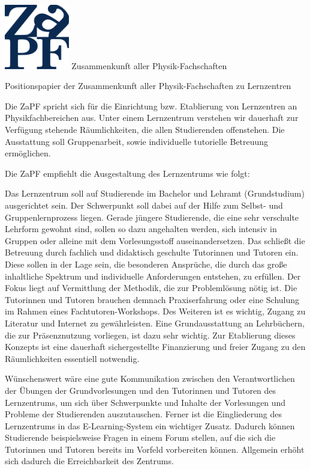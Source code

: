 \documentclass[DIV=calc]{scrartcl}
\begin{document}
\hfill
\begin{minipage}{120pt}
\vspace{-1.8cm}
\includegraphics[width=80pt]{logo.pdf}
\centering
\small Zusammenkunft aller Physik-Fachschaften
\end{minipage}
\begin{center}
\huge{Positionspapier der Zusammenkunft aller Physik-Fachschaften zu Lernzentren} \\
\normalsize
\end{center}

Die ZaPF spricht sich für die Einrichtung bzw. Etablierung von Lernzentren an Physikfachbereichen aus.
Unter einem Lernzentrum verstehen wir dauerhaft zur Verfügung stehende Räumlichkeiten, die allen Studierenden offenstehen. Die Ausstattung soll Gruppenarbeit, sowie individuelle tutorielle Betreuung ermöglichen.

Die ZaPF empfiehlt die Ausgestaltung des Lernzentrums wie folgt:

Das Lernzentrum soll auf Studierende im Bachelor und Lehramt (Grundstudium) ausgerichtet sein. Der Schwerpunkt soll dabei auf der Hilfe zum Selbst- und Gruppenlernprozess liegen.
Gerade jüngere Studierende, die eine sehr verschulte Lehrform gewohnt sind, sollen so dazu angehalten werden, sich intensiv in Gruppen oder alleine mit dem Vorlesungsstoff  auseinandersetzen. 
Das schließt die Betreuung durch fachlich und didaktisch geschulte Tutorinnen und Tutoren ein. Diese sollen in der Lage sein, die besonderen Ansprüche, die durch das große inhaltliche Spektrum und individuelle Anforderungen entstehen, zu erfüllen. Der Fokus liegt auf Vermittlung der Methodik, die zur Problemlösung nötig ist. Die Tutorinnen und Tutoren brauchen demnach Praxiserfahrung oder eine Schulung im Rahmen eines Fachtutoren-Workshops.
Des Weiteren ist es wichtig, Zugang zu Literatur und Internet zu gewährleisten. Eine Grundausstattung an Lehrbüchern, die zur Präsenznutzung vorliegen, ist dazu sehr wichtig.
Zur Etablierung dieses Konzepts ist eine dauerhaft sichergestellte Finanzierung und freier Zugang zu den Räumlichkeiten essentiell notwendig.

Wünschenswert wäre eine gute Kommunikation zwischen den Verantwortlichen der Übungen der Grundvorlesungen und den Tutorinnen und Tutoren des Lernzentrums, um sich über Schwerpunkte und Inhalte der Vorlesungen und Probleme der Studierenden auszutauschen.
Ferner ist die Eingliederung des Lernzentrums in das E-Learning-System ein wichtiger Zusatz. Dadurch können Studierende beispielsweise Fragen in einem Forum stellen, auf die sich die Tutorinnen und Tutoren bereits im Vorfeld vorbereiten können. Allgemein erhöht sich dadurch die Erreichbarkeit des Zentrums.
\end{document}
